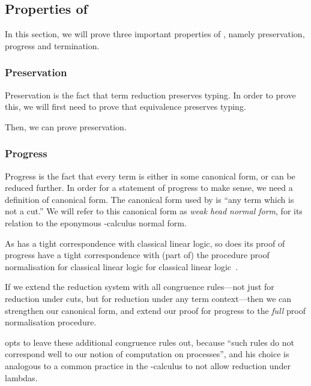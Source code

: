 \subsection{Properties of \rcp}\label{sec:cp-properties}
In this section, we will prove three important properties of \rcp, namely
preservation, progress and termination.

\subsubsection{Preservation}
Preservation is the fact that term reduction preserves typing. In order to prove
this, we will first need to prove that equivalence preserves typing.


Then, we can prove preservation.




\subsubsection{Progress}
Progress is the fact that every term is either in some canonical form, or can be
reduced further. In order for a statement of progress to make sense, we need a
definition of canonical form. The canonical form used by \cp is ``any term which
is not a cut.'' We will refer to this canonical form as \emph{weak head normal
form}, for its relation to the eponymous \textlambda-calculus normal form. 

As \cp has a tight correspondence with classical linear logic, so does its proof
of progress have a tight correspondence with (part of) the procedure proof
normalisation for classical linear logic for classical linear
logic~\cite{girard1987}.

If we extend the reduction system with all congruence rules---not just
\cpRedGammaCut for reduction under cuts, but for reduction under any term
context---then we can strengthen our canonical form, and extend our proof for
progress to the \emph{full} proof normalisation procedure.


 opts to leave these additional congruence rules out,
because ``such rules do not correspond well to our notion of computation on
processes'', and his choice is analogous to a common practice in the
\textlambda-calculus to not allow reduction under lambdas.



